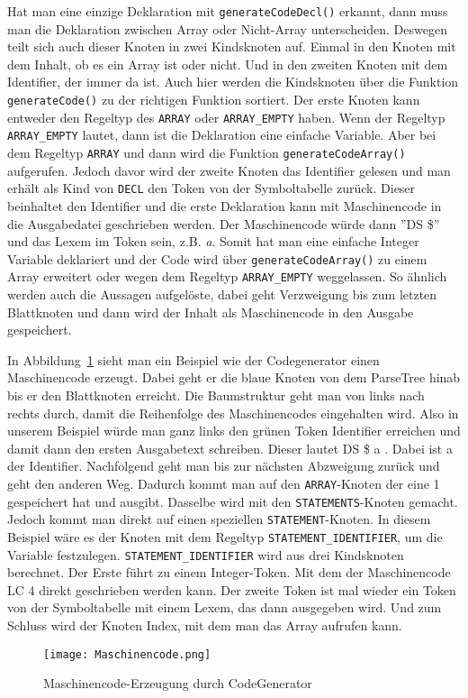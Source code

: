 

Hat man eine einzige Deklaration mit \texttt{generateCodeDecl()} erkannt, dann muss man die Deklaration zwischen Array oder  Nicht-Array unterscheiden. Deswegen teilt sich auch dieser Knoten in zwei Kindsknoten auf. Einmal in den Knoten mit dem Inhalt, ob es ein Array ist oder nicht. Und in den zweiten Knoten mit dem Identifier, der immer da ist. Auch hier werden die Kindsknoten über die Funktion \texttt{generateCode()} zu der richtigen Funktion sortiert. Der erste Knoten kann entweder den Regeltyp des \texttt{ARRAY} oder \texttt{ARRAY\_EMPTY} haben. Wenn der Regeltyp \texttt{ARRAY\_EMPTY} lautet, dann ist die Deklaration eine einfache Variable. Aber bei dem Regeltyp \texttt{ARRAY} und dann wird die Funktion \texttt{generateCodeArray()} aufgerufen. Jedoch davor wird der zweite Knoten das Identifier gelesen und man erhält als Kind von \texttt{DECL} den Token von der Symboltabelle zurück. Dieser beinhaltet den Identifier und die erste Deklaration kann mit Maschinencode in die Ausgabedatei geschrieben werden. Der Maschinencode würde dann ''DS \$'' und das Lexem im Token sein, z.B. \emph{a}. Somit hat man eine einfache Integer Variable deklariert und der Code wird über \texttt{generateCodeArray()} zu einem Array erweitert oder wegen dem Regeltyp \texttt{ARRAY\_EMPTY} weggelassen. So ähnlich werden auch die Aussagen aufgelöste, dabei geht Verzweigung bis zum letzten Blattknoten und dann wird der Inhalt als Maschinencode in den Ausgabe gespeichert.



In Abbildung~\ref{fig:codegenerator} sieht man ein Beispiel wie der Codegenerator einen Maschinencode erzeugt. Dabei geht er die blaue Knoten von dem ParseTree hinab bis er den Blattknoten erreicht. Die Baumstruktur geht man von links nach rechts durch, damit die Reihenfolge des Maschinencodes eingehalten wird. Also in unserem Beispiel würde man ganz links den grünen Token Identifier erreichen und damit dann den ersten Ausgabetext schreiben. Dieser lautet DS \$ a . Dabei ist a der Identifier. Nachfolgend geht man bis zur nächsten Abzweigung zurück und geht den anderen Weg. Dadurch kommt man auf den \texttt{ARRAY}-Knoten der eine 1 gespeichert hat und ausgibt. Dasselbe wird mit den \texttt{STATEMENTS}-Knoten gemacht. Jedoch  kommt man direkt auf  einen speziellen \texttt{STATEMENT}-Knoten. In diesem Beispiel wäre es der Knoten mit dem Regeltyp \texttt{STATEMENT\_IDENTIFIER}, um die Variable festzulegen. \texttt{STATEMENT\_IDENTIFIER} wird aus drei Kindsknoten berechnet. Der Erste führt zu einem Integer-Token. Mit dem der Maschinencode LC 4 direkt geschrieben werden kann. Der zweite Token ist mal wieder ein Token von der Symboltabelle mit einem Lexem, das dann ausgegeben wird. Und zum Schluss wird der Knoten Index, mit dem man das Array aufrufen kann.
\vspace{4cm}

\begin{figure}[!htb]
    \centering
      \texttt{[image: Maschinencode.png]}
    \caption{Maschinencode-Erzeugung durch CodeGenerator}\label{fig:codegenerator}
\end{figure}
